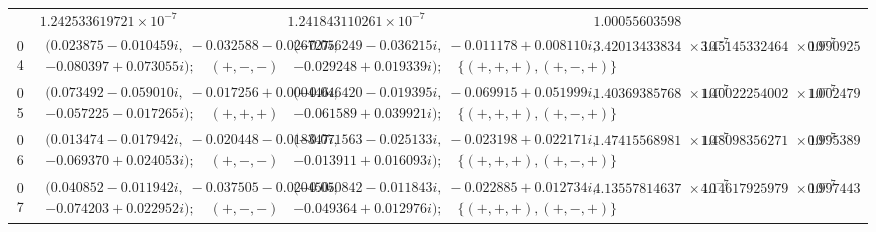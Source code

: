 \begin{table}[p]
{\begin{tabular}{@{}cllrrr@{}}
      & $1.242533619721\times10^{-7}$ & $1.241843110261\times10^{-7}$ & $1.000556035987$ \\
    04
      & $\begin{gathered}(0.023875-0.010459i,\;-0.032588-0.026727i,\\-0.080397+0.073055i);\quad(+,-,-)\end{gathered}$
      & $\begin{gathered}(-0.056249-0.036215i,\;-0.011178+0.008110i,\\-0.029248+0.019339i);\quad\{(+,+,+),(+,-,+)\}\end{gathered}$
      & $3.420134338341\times10^{-7}$ & $3.451453324643\times10^{-7}$ & $0.990925855471$ \\
    05
      & $\begin{gathered}(0.073492-0.059010i,\;-0.017256+0.000446i,\\-0.057225-0.017265i);\quad(+,+,+)\end{gathered}$
      & $\begin{gathered}(-0.046420-0.019395i,\;-0.069915+0.051999i,\\-0.061589+0.039921i);\quad\{(+,+,+),(+,-,+)\}\end{gathered}$
      & $1.403693857686\times10^{-7}$ & $1.400222540025\times10^{-7}$ & $1.002479118541$ \\
    06
      & $\begin{gathered}(0.013474-0.017942i,\;-0.020448-0.018347i,\\-0.069370+0.024053i);\quad(+,-,-)\end{gathered}$
      & $\begin{gathered}(-0.071563-0.025133i,\;-0.023198+0.022171i,\\-0.013911+0.016093i);\quad\{(+,+,+),(+,-,+)\}\end{gathered}$
      & $1.474155689816\times10^{-7}$ & $1.480983562719\times10^{-7}$ & $0.995389636270$ \\
    07
      & $\begin{gathered}(0.040852-0.011942i,\;-0.037505-0.020450i,\\-0.074203+0.022952i);\quad(+,-,-)\end{gathered}$
      & $\begin{gathered}(-0.050842-0.011843i,\;-0.022885+0.012734i,\\-0.049364+0.012976i);\quad\{(+,+,+),(+,-,+)\}\end{gathered}$
      & $4.135578146371\times10^{-7}$ & $4.146179259792\times10^{-7}$ & $0.997443160858$ \\

\end{tabular}}
\end{table}
